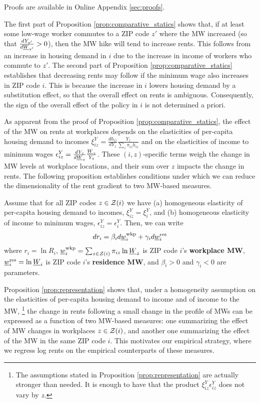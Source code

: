 Proofs are available in Online Appendix \ref{sec:proofs}.

The first part of Proposition \ref{prop:comparative_statics} shows that,
if at least some low-wage worker commutes to a ZIP code $z'$ where the MW 
increased  (so that $\frac{d Y_{z'}}{d \underline{W}_{z'}}>0$),
then the MW hike will tend to increase rents.
This follows from an increase in housing demand in $i$ due to the increase in
income of workers who commute to $z'$.
The second part of Proposition \ref{prop:comparative_statics} establishes that 
decreasing rents may follow if the minimum wage also increases in ZIP code $i$.
This is because the increase in $i$ lowers housing demand by a substitution
effect, so that the overall effect on rents is ambiguous.
Consequently, the sign of the overall effect of the policy in $i$ is not 
determined a priori.

As apparent from the proof of Proposition \ref{prop:comparative_statics}, 
the effect of the MW on rents at workplaces depends on the elasticities of 
per-capita housing demand to incomes
$\xi^Y_{iz} = \frac{d h_{iz}}{d Y_z} \frac{Y_z}{\sum_z \pi_{iz} h_{iz}}$ and
on the elasticities of income to minimum wages
$\epsilon_{iz}^Y = \frac{d Y_z}{d \underline{W}_z} \frac{\underline{W}_z}{Y_z}$.
These $(i,z)$-specific terms weigh the change in MW levels at workplace locations,
and their sum over $z$ impacts the change in rents.
The following proposition establishes conditions under which we can reduce the 
dimensionality of the rent gradient to two MW-based measures.

\begin{prop}[Representation]\label{prop:representation}
    Assume that for all ZIP codes $z\in\mathcal{Z}(i)$ we have
    (a) homogeneous elasticity of per-capita housing demand to incomes,
    $\xi^Y_{iz}=\xi^Y_{i}$, and
    (b) homogeneous elasticity of income to minimum wages,
    $\epsilon_{iz}^Y=\epsilon_i^Y$.
    Then, we can write
    \begin{equation} \label{eq:theory_representation}
        d r_i = \beta_i  d \underline{w}^{\text{wkp}}_i
              + \gamma_i d \underline{w}^{\text{res}}_i
    \end{equation}
    where 
    $r_{i} = \ln R_i$,
    $\underline{w}_{i}^{\text{wkp}} = \sum_{z\in\mathcal{Z}(i)} \pi_{iz} \ln \underline{W}_z$ 
    is ZIP code $i$'s \textbf{workplace MW}, 
    $\underline{w}^{\text{res}}_i = \ln \underline{W}_i$ 
    is ZIP code $i$'s \textbf{residence MW}, and 
    $\beta_i > 0$ and $\gamma_i < 0$ are parameters.
\end{prop}

Proposition \ref{prop:representation} shows that, under a homogeneity assumption
on the elasticities of per-capita housing demand to income and 
of income to the MW,%
\footnote{The assumptions stated in Proposition \ref{prop:representation} are 
actually stronger than needed.
It is enough to have that the product $\xi^Y_{iz} \epsilon_{iz}^Y$ does not vary 
by $z$.}
the change in rents following a small change in the profile of MWs can be 
expressed as a function of two MW-based measures:
one summarizing the effect of MW changes in workplaces $z\in\mathcal{Z}(i)$,
and another one summarizing the effect of the MW in the same ZIP code $i$.
This motivates our empirical strategy, where we regress log rents on the 
empirical counterparts of these measures.

